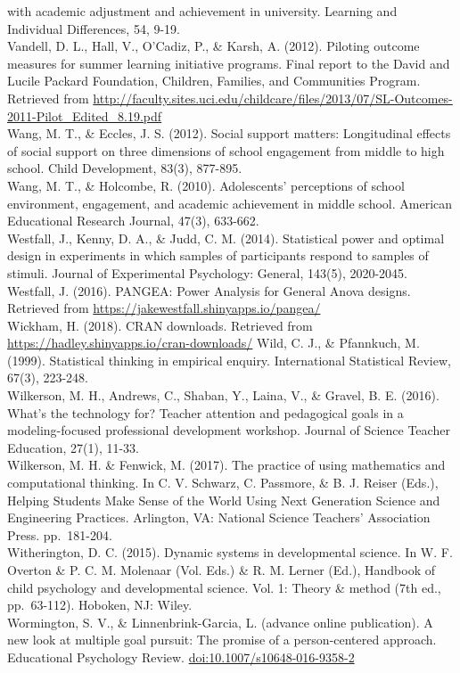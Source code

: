 \documentclass[]{msu-thesis}
\theoremstyle{definition}
\theoremstyle{definition}
\theoremstyle{definition}
\theoremstyle{remark}
\begin{document}
with academic adjustment and achievement in university. Learning and
Individual Differences, 54, 9-19.\\
Vandell, D. L., Hall, V., O'Cadiz, P., \& Karsh, A. (2012). Piloting
outcome measures for summer learning initiative programs. Final report
to the David and Lucile Packard Foundation, Children, Families, and
Communities Program. Retrieved from
\url{http://faculty.sites.uci.edu/childcare/files/2013/07/SL-Outcomes-2011-Pilot_Edited_8.19.pdf}\\
Wang, M. T., \& Eccles, J. S. (2012). Social support matters:
Longitudinal effects of social support on three dimensions of school
engagement from middle to high school. Child Development, 83(3),
877-895.\\
Wang, M. T., \& Holcombe, R. (2010). Adolescents' perceptions of school
environment, engagement, and academic achievement in middle school.
American Educational Research Journal, 47(3), 633-662.\\
Westfall, J., Kenny, D. A., \& Judd, C. M. (2014). Statistical power and
optimal design in experiments in which samples of participants respond
to samples of stimuli. Journal of Experimental Psychology: General,
143(5), 2020-2045.\\
Westfall, J. (2016). PANGEA: Power Analysis for General Anova designs.
Retrieved from \url{https://jakewestfall.shinyapps.io/pangea/}\\
Wickham, H. (2018). CRAN downloads. Retrieved from
\url{https://hadley.shinyapps.io/cran-downloads/} Wild, C. J., \&
Pfannkuch, M. (1999). Statistical thinking in empirical enquiry.
International Statistical Review, 67(3), 223-248.\\
Wilkerson, M. H., Andrews, C., Shaban, Y., Laina, V., \& Gravel, B. E.
(2016). What's the technology for? Teacher attention and pedagogical
goals in a modeling-focused professional development workshop. Journal
of Science Teacher Education, 27(1), 11-33.\\
Wilkerson, M. H. \& Fenwick, M. (2017). The practice of using
mathematics and computational thinking. In C. V. Schwarz, C. Passmore,
\& B. J. Reiser (Eds.), Helping Students Make Sense of the World Using
Next Generation Science and Engineering Practices. Arlington, VA:
National Science Teachers' Association Press. pp.~181-204.\\
Witherington, D. C. (2015). Dynamic systems in developmental science. In
W. F. Overton \& P. C. M. Molenaar (Vol. Eds.) \& R. M. Lerner (Ed.),
Handbook of child psychology and developmental science. Vol. 1: Theory
\& method (7th ed., pp.~63-112). Hoboken, NJ: Wiley.\\
Wormington, S. V., \& Linnenbrink-Garcia, L. (advance online
publication). A new look at multiple goal pursuit: The promise of a
person-centered approach. Educational Psychology Review.
\url{doi:10.1007/s10648-016-9358-2}
\end{document}
